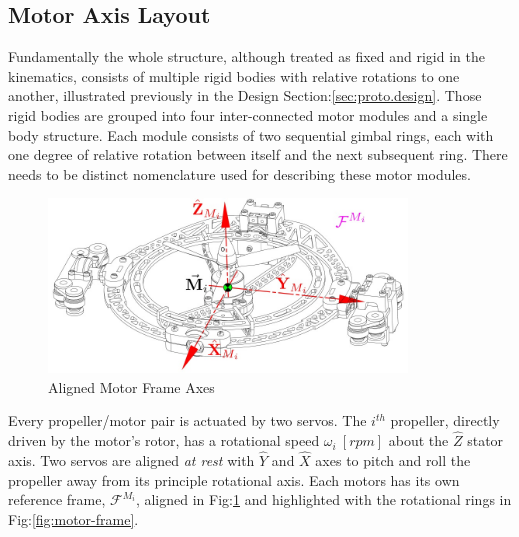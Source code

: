 \subsection{Motor Axis Layout}
\label{subsec:proto.conventions.motoraxis}
Fundamentally the whole structure, although treated as fixed and rigid in the kinematics, consists of multiple rigid bodies with relative rotations to one another, illustrated previously in the Design Section:\ref{sec:proto.design}. Those rigid bodies are grouped into four inter-connected motor modules and a single body structure. Each module consists of two sequential gimbal rings, each with one degree of relative rotation between itself and the next subsequent ring. There needs to be distinct nomenclature used for describing these motor modules. 
\begin{figure}[htbp]
\centering
\includegraphics[width=0.85\textwidth]{figs/motor-axes}
\caption{Aligned Motor Frame Axes}
\label{fig:motor-axes}
\end{figure}
\par
Every propeller/motor pair is actuated by two servos. The $i^{th}$ propeller, directly driven by the motor's rotor, has a rotational speed $\omega_i~[rpm]$ about the $\hat{Z}$ stator axis. Two servos are aligned \emph{at rest} with $\hat{Y}$ and $\hat{X}$ axes to pitch and roll the propeller away from its principle rotational axis. Each motors has its own reference frame, $\mathcal{F}^{M_i}$, aligned in Fig:\ref{fig:motor-axes} and highlighted with the rotational rings in Fig:\ref{fig:motor-frame}.
\par
